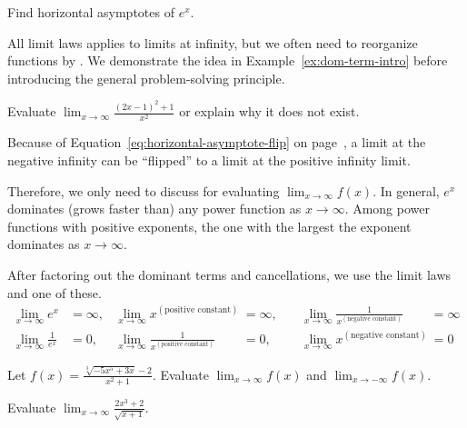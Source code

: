 \documentclass[../main.tex]{subfiles}
\begin{document}
  \begin{example}
    Find horizontal asymptotes of \(e^{x}\).

  \end{example}

  All limit laws applies to limits at infinity, but we often need to reorganize functions by . We demonstrate the idea in Example~\ref{ex:dom-term-intro} before introducing the general problem-solving principle.

  \begin{example}\label{ex:dom-term-intro}
    Evaluate \(\lim_{x \to \infty} \frac{(2x-1)^{2} + 1}{x^{2}}\) or explain why it does not exist.

  \end{example}
  \clearpage

  Because of Equation~\eqref{eq:horizontal-asymptote-flip} on page~\pageref{eq:horizontal-asymptote-flip}, a limit at the negative infinity can be ``flipped'' to a limit at the positive infinity limit. 

  Therefore, we only need to discuss  for evaluating \(\lim_{x \to \infty} f(x)\). In general, \(e^{x}\) dominates (grows faster than) any power function as \(x \to \infty\). Among power functions with positive exponents, the one with the largest the exponent dominates as \(x \to \infty\).

  After factoring out the dominant terms and cancellations, we use the limit laws and one of these.
  \begin{align*}
    \lim_{x \to \infty} e^{x} &= \infty, & \lim_{x \to \infty} x^{(\text{positive constant})} &= \infty, & \quad \lim_{x \to \infty} \frac{1}{x^{(\text{negative constant})}} &= \infty \\
    \lim_{x \to \infty} \frac{1}{e^{x}} &= 0, & \lim_{x \to \infty} \frac{1}{x^{(\text{positive constant})}} &= 0, & \quad \lim_{x \to \infty} x^{(\text{negative constant})} &= 0
  \end{align*}

  \begin{example}
    Let \(f(x) = \frac{\sqrt[3]{-5x^{5} + 3x} - 2}{x^{2} + 1}\). 
    Evaluate \(\lim_{x \to \infty} f(x)\) and \(\lim_{x \to -\infty} f(x)\). 

  \end{example}

  \begin{example}
    Evaluate \(\lim_{x \to \infty} \frac{2x^{3} + 2}{\sqrt{x + 1}}\).
  \end{example}
  \clearpage
\end{document}
